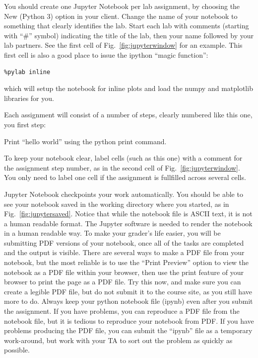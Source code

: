 You should create one Jupyter Notebook per lab assignment, by choosing
the New (Python 3) option in your client.  Change the name of your
notebook to something that clearly identifies the lab.  Start each lab
with comments (starting with ``\#'' symbol) indicating the title of
the lab, then your name followed by your lab partners.  See the first
cell of Fig.~\ref{fig:jupyterwindow} for an example.  This first cell
is also a good place to issue the ipython ``magic function'':
\begin{verbatim}
%pylab inline
\end{verbatim}
which will setup the notebook for inline plots and load the numpy and matplotlib libraries for you.

Each assignment will consist of a number of steps, clearly numbered like this one, you first step:

\begin{plot}
Print ``hello world'' using the python print command.
\end{plot}
\noindent
To keep your notebook clear, label cells (such as this one) with a
comment for the assignment step number, as in the second cell of
Fig.~\ref{fig:jupyterwindow}.  You only need to label one cell if
the assignment is fullfilled across several cells.

Jupyter Notebook checkpoints your work automatically.  You should be
able to see your notebook saved in the working directory where you
started, as in Fig.~\ref{fig:jupytersaved}.  Notice that while the
notebook file is ASCII text, it is not a human readable format.  The
Jupyter software is needed to render the notebook in a human readable
way.  To make your grader's life easier, you will be submitting PDF
versions of your notebook, once all of the tasks are completed and the
output is visible.  There are several ways to make a PDF file from
your notebook, but the most reliable is to use the ``Print Preview''
option to view the notebook as a PDF file within your browser, then
use the print feature of your browser to print the page as a PDF file.
Try this now, and make sure you can create a legible PDF file, but do
not submit it to the course site, as you still have more to do.
Always keep your python notebook file (ipynb) even after you submit
the assignment.  If you have problems, you can reproduce a PDF file
from the notebook file, but it is tedious to reproduce your notebook
from PDF.  If you have problems producing the PDF file, you can submit
the ``ipynb'' file as a temporary work-around, but work with your TA
to sort out the problem as quickly as possible.

